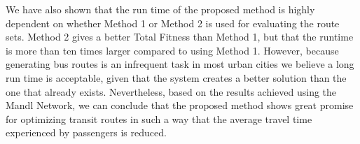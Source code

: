 We have also shown that the run time of the proposed method is highly dependent on whether Method 1 or Method 2 is used for evaluating the route sets. Method 2 gives a better Total Fitness than Method 1, but that the runtime is more than ten times larger compared to using Method 1. However, because generating bus routes is an infrequent task in most urban cities we believe a long run time is acceptable, given that the system creates a better solution than the one that already exists. Nevertheless, based on the results achieved using the Mandl Network, we can conclude that the proposed method shows great promise for optimizing transit routes in such a way that the average travel time experienced by passengers is reduced. 






